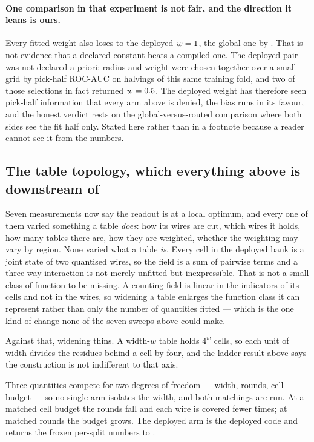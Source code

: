 \documentclass[11pt]{article}
\begin{document}
\paragraph{One comparison in that experiment is not fair, and the direction it
leans is ours.} Every fitted weight also loses to the deployed
\(w=1{}\), the global one by \GateRouteGlobalVsDeployed{}. That is
not evidence that a declared constant beats a compiled one. The deployed pair was
not declared a priori: radius and weight were chosen together over a small grid by
pick-half ROC-AUC on halvings of this same training fold, and two of those
selections in fact returned \(w=0.5{}\). The deployed weight has
therefore seen pick-half information that every arm above is denied, the bias runs
in its favour, and the honest verdict rests on the global-versus-routed comparison
where both sides see the fit half only. Stated here rather than in a footnote
because a reader cannot see it from the numbers.

\subsection{The table topology, which everything above is downstream of}
\label{sec:width}
Seven measurements now say the readout is at a local optimum, and every one of
them varied something a table \emph{does}: how its wires are cut, which wires it
holds, how many tables there are, how they are weighted, whether the weighting
may vary by region. None varied what a table \emph{is}. Every cell in the
deployed bank is a joint state of two quantised wires, so the field is a sum of
pairwise terms and a three-way interaction is not merely unfitted but
inexpressible. That is not a small class of function to be missing. A counting
field is linear in the indicators of its cells and not in the wires, so widening a
table enlarges the function class it can represent rather than only the number of
quantities fitted --- which is the one kind of change none of the seven sweeps
above could make.

Against that, widening thins. A width-\(w\) table holds \(4^w\) cells, so each
unit of width divides the residues behind a cell by four, and the ladder result
above says the construction is not indifferent to that axis.

Three quantities compete for two degrees of freedom --- width, rounds, cell
budget --- so no single arm isolates the width, and both matchings are run. At a
matched cell budget the rounds fall and each wire is covered fewer times; at
matched rounds the budget grows. The deployed arm is the deployed code and returns
the frozen per-split numbers to \WidthRepro{}.
\end{document}
